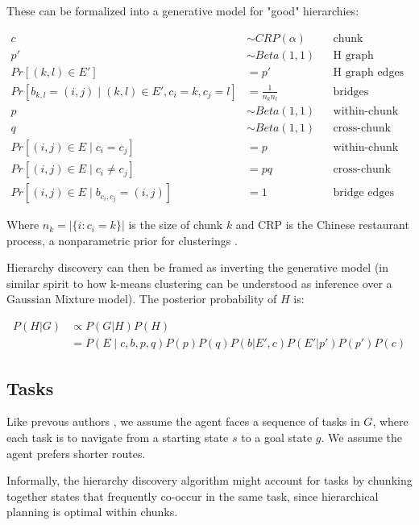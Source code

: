 \documentclass[11pt]{article}
\begin{document}
These can be formalized into a generative model for "good" hierarchies:

\begin{align*}
    c &\sim CRP(\alpha)  		&& \text{chunk assignments} \\
    p' &\sim Beta(1,1)   		&& \text{H graph density} \\
    Pr[(k,l) \in E'] &= p'      && \text{H graph edges} \\
    Pr[b_{k,l} = (i,j) \mid (k,l) \in E', c_i = k, c_j = l] &= \frac{1}{n_k n_l}   && \text{bridges}  \\
    p &\sim Beta(1,1)  		&& \text{within-chunk density} \\
    q &\sim Beta(1,1)  		&& \text{cross-chunk density penalty} \\
    Pr[(i,j) \in E \mid c_i = c_j] &= p    && \text{within-chunk edges} \\
    Pr[(i,j) \in E \mid c_i \ne c_j] &= pq    && \text{cross-chunk edges} \\
    Pr[(i,j) \in E \mid b_{c_i,c_j} = (i,j)] &= 1    && \text{bridge edges} 
\end{align*}

Where $n_k = |\{ i : c_i=k \}|$ is the size of chunk $k$ and CRP is the Chinese restaurant process, a nonparametric prior for clusterings \cite{gershman2012tutorial}. 

Hierarchy discovery can then be framed as inverting the generative model (in similar spirit to how k-means clustering can be understood as inference over a Gaussian Mixture model). The posterior probability of $H$ is:

\begin{align}
\label{eq:post}
    P(H|G) &\propto P(G|H) P(H) \\
    &= P(E \mid c,b,p,q) P(p) P(q) P(b|E',c) P(E'|p') P(p') P(c)
\end{align}


\subsection{Tasks}

Like prevous authors \cite{Solway2014, balaguer2016neural}, we assume the agent faces a sequence of tasks in $G$, where each task is to navigate from a starting state $s$ to a goal state $g$. We assume the agent prefers shorter routes.

Informally, the hierarchy discovery algorithm might account for tasks by chunking together states that frequently co-occur in the same task, since hierarchical planning is optimal within chunks. 
\end{document}
